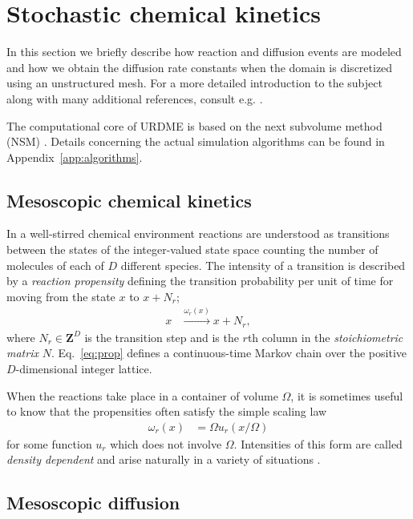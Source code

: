  \section{Stochastic chemical kinetics}
\label{app:coeffs}
 
 In this section we briefly describe how reaction and diffusion events
are modeled and how we obtain the diffusion rate constants when the
domain is discretized using an unstructured mesh. For a more detailed
introduction to the subject along with many additional references,
consult e.g. \cite{stefan_phd}.

The computational core of URDME is based on the next subvolume method
(NSM) \cite{BISTAB}. Details
concerning the actual simulation algorithms can be found in
Appendix~\ref{app:algorithms}.


\subsection{Mesoscopic chemical kinetics}

In a well-stirred chemical environment reactions are understood as
transitions between the states of the integer-valued state space
counting the number of molecules of each of $D$ different species. The
intensity of a transition is described by a \emph{reaction propensity}
defining the transition probability per unit of time for moving from
the state $x$ to $x+N_r$;
\begin{align}
  \label{eq:prop}
  x &\xrightarrow{\omega_{r}(x)} x+N_{r},
\end{align}
where $N_{r} \in \mathbf{Z}^{D}$ is the transition step and is the
$r$th column in the \emph{stoichiometric matrix}
$N$. Eq.~\eqref{eq:prop} defines a continuous-time Markov chain over
the positive $D$-dimensional integer lattice.

When the reactions take place in a container of volume $\Omega$, it is
sometimes useful to know that the propensities often satisfy the
simple scaling law
\begin{align}
  \omega_{r}(x) &= \Omega u_{r}(x/\Omega)
\end{align}
for some function $u_{r}$ which does not involve $\Omega$. Intensities
of this form are called \emph{density dependent} and arise naturally
in a variety of situations \cite[Ch.~11]{Markovappr}.

\subsection{Mesoscopic diffusion}
\label{subsec:mesodiff}

